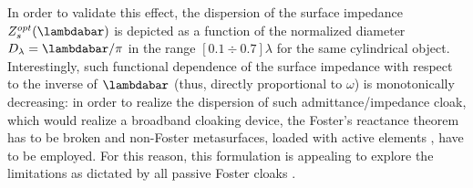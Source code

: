 \documentclass[reprint, showpacs, amsmath,amssymb, aps,
prb]{revtex4-1}
\begin{document}
In order to validate this effect, the dispersion of the surface impedance $Z_s^{opt}(\lambdabar)$ is depicted as a function of the normalized diameter $D_\lambda=\lambdabar/\pi$ in the range $[0.1\div 0.7]\lambda$ for the same cylindrical object. Interestingly, such functional dependence of the surface impedance with respect to the inverse of $\lambdabar$ (thus, directly proportional to $\omega$) is monotonically decreasing: in order to realize the dispersion of such admittance/impedance cloak, which would realize a broadband cloaking device, the Foster's reactance theorem has to be broken \cite{Foster} and non-Foster metasurfaces, loaded with active elements \cite{Fost_Meta}, have to be employed. For this reason, this formulation is appealing to explore the limitations as dictated by all passive Foster cloaks \cite{Mont_inv_exp}.
\end{document}
